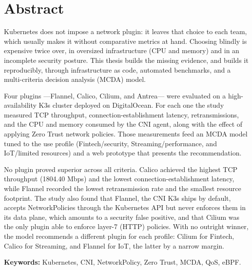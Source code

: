 \chapter{Abstract}
Kubernetes does not impose a network plugin: it leaves that choice to each team, which usually makes it without comparative metrics at hand. Choosing blindly is expensive twice over, in oversized infrastructure (CPU and memory) and in an incomplete security posture. This thesis builds the missing evidence, and builds it reproducibly, through infrastructure as code, automated benchmarks, and a multi-criteria decision analysis (MCDA) model.

Four plugins ---Flannel, Calico, Cilium, and Antrea--- were evaluated on a high-availability K3s cluster deployed on DigitalOcean. For each one the study measured TCP throughput, connection-establishment latency, retransmissions, and the CPU and memory consumed by the CNI agent, along with the effect of applying Zero Trust network policies. Those measurements feed an MCDA model tuned to the use profile (Fintech/security, Streaming/performance, and IoT/limited resources) and a web prototype that presents the recommendation.

No plugin proved superior across all criteria. Calico achieved the highest TCP throughput (1804.40 Mbps) and the lowest connection-establishment latency, while Flannel recorded the lowest retransmission rate and the smallest resource footprint. The study also found that Flannel, the CNI K3s ships by default, accepts NetworkPolicies through the Kubernetes API but never enforces them in its data plane, which amounts to a security false positive, and that Cilium was the only plugin able to enforce layer-7 (HTTP) policies. With no outright winner, the model recommends a different plugin for each profile: Cilium for Fintech, Calico for Streaming, and Flannel for IoT, the latter by a narrow margin.

\vspace{1cm}
\textbf{Keywords:} Kubernetes, CNI, NetworkPolicy, Zero Trust, MCDA, QoS, eBPF.
\newpage